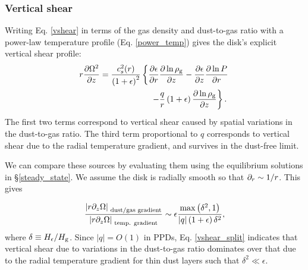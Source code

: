 \subsubsection{Vertical shear}\label{vertshear}
Writing Eq. \ref{vshear} in terms of the gas density and dust-to-gas
ratio with a power-law temperature profile (Eq. \ref{power_temp})
gives the disk's explicit vertical shear profile:
\begin{align}\label{vshear2}
  &r\frac{\p \Omega^2}{\p z}  =
  \frac{c_s^2(r)}{\left(1+\epsilon\right)^2}\left\{
  \frac{\p\epsilon}{\p r}\frac{\p\ln{\rhog}}{\p z}
 -\frac{\p\epsilon}{\p z}\frac{\p\ln{P}}{\p r}\right.\notag\\
  &\phantom{ r\frac{\p \Omega^2}{\p z}  =
    \frac{c_s^2(r)}{\left(1+\epsilon\right)^2}\left\{\right\} }
  \left. -\frac{q}{r} \left(1+\epsilon\right)\frac{\p\ln{\rhog}}{\p z}
  \right\}. 
\end{align}
The first two terms correspond to vertical shear caused by spatial
variations in the dust-to-gas ratio. The third term
proportional to $q$ corresponds to vertical shear due to the 
radial temperature gradient, and survives in the dust-free limit. 

We can compare these sources by 
evaluating them using the equilibrium
solutions in \S\ref{steady_state}. We assume the disk is radially
smooth so that $\partial_r\sim 1/r$. %
This gives 

\begin{align}\label{vshear_split}
  \frac{\left|r\partial_z\Omega\right|_{\text{
        dust/gas gradient}}}{\left|r\partial_z\Omega\right|_{\text{
        temp. gradient}}} \sim
 \epsilon \frac{\mathrm{max}\left(\delta^2,
    1\right)}{\left|q\right|\left(1+\epsilon\right)\delta^2},
\end{align}
where $\delta\equiv H_\epsilon/H_\mathrm{g}$. 
Since $|q|=O(1)$ in PPDs, Eq. \ref{vshear_split} indicates that
vertical shear due to variations in the dust-to-gas ratio dominates 
over that due to the radial temperature gradient for thin dust layers
such that $\delta^2\ll \epsilon$. %






